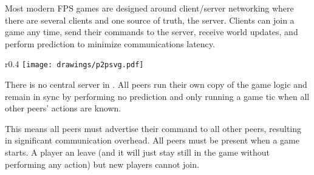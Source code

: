 Most modern FPS games are designed around client/server networking where there are several clients and one source of truth, the server. Clients can join a game any time, send their commands to the server, receive world updates, and perform prediction to minimize communications latency.\\
\par
\begin{wrapfigure}[12]{r}{0.4\textwidth}
\centering
\texttt{[image: drawings/p2psvg.pdf]}
\end{wrapfigure}
There is no central server in \doom. All peers run their own copy of the game logic and remain in sync by performing no prediction and only running a game tic when all other peers' actions are known.\\
\par
 This means all peers must advertise their command to all other peers, resulting in significant communication overhead. 
All peers must be present when a game starts. A player an leave (and it will just stay still in the game without performing any action) but new players cannot join.
\pagebreak





